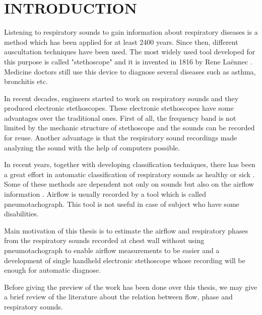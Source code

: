 \chapter{INTRODUCTION}
Listening to respiratory sounds to gain information about respiratory diseases is a method which has been applied for at least 2400 years. Since then, different auscultation techniques have been used. The most widely used tool developed for this purpose is called "stethoscope" and it is invented in 1816 by Rene Laënnec \cite{breath-sounds}. Medicine doctors still use this device to diagnose several diseases such as asthma, bronchitis etc. \par

In recent decades, engineers started to work on respiratory sounds and they produced electronic stethoscopes. These electronic stethoscopes have some
advantages over the traditional ones. First of all, the frequency band
is not limited \cite{advances-beyond-stet} by the mechanic structure of stethoscope and the sounds can be recorded for reuse. Another advantage is that the respiratory sound recordings made analyzing the sound with the help of computers possible. \par
 
In recent years, together with developing classification techniques, there has been a great effort in automatic classification of respiratory sounds as healthy or sick \cite{ipek-svm-gmm}. Some of these methods are dependent not only on sounds but also on the airflow information \cite{lung-subphase}. Airflow is usually recorded by a tool which is called pneumotachograph. This tool is not useful in case of subject who have some disabilities.

Main motivation of this thesis is to estimate the airflow and respiratory phases from the respiratory sounds recorded at chest wall without using pneumotachograph to enable airflow measurements to be easier and a development of single handheld electronic stethoscope whose recording will be enough for automatic diagnose. 

Before giving the preview of the work has been done over this thesis, we may give a brief review of the literature about the relation between flow, phase and respiratory sounds.

